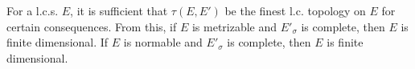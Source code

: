 For a l.c.s. $E$, it is sufficient that $\tau(E, E')$ be the finest l.c. topology on $E$ for certain consequences. From this, if $E$ is metrizable and $E'_\sigma$ is complete, then $E$ is finite dimensional. If $E$ is normable and $E'_\sigma$ is complete, then $E$ is finite dimensional.
